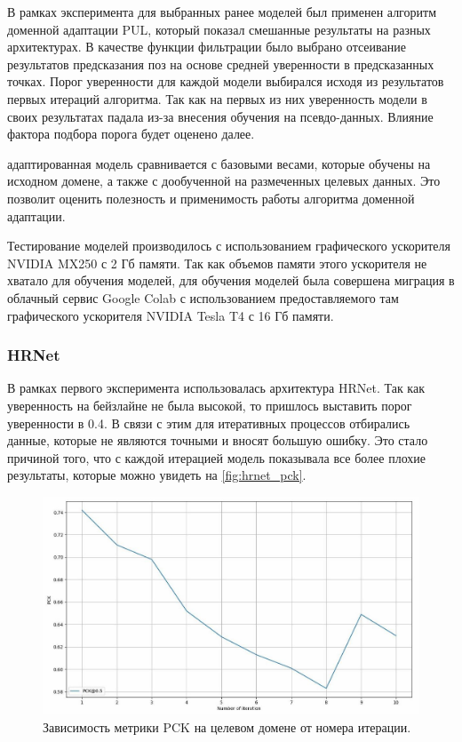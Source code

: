 В рамках эксперимента для выбранных ранее моделей был применен алгоритм доменной адаптации PUL, который показал смешанные результаты на разных архитектурах. В качестве функции фильтрации было выбрано отсеивание результатов предсказания поз на основе средней уверенности в предсказанных точках. Порог уверенности для каждой модели выбирался исходя из результатов первых итераций алгоритма. Так как на первых из них уверенность модели в своих результатах падала из-за внесения обучения на псевдо-данных. Влияние фактора подбора порога будет оценено далее.

 адаптированная модель сравнивается с базовыми весами, которые обучены на исходном домене, а также с дообученной на размеченных целевых данных. Это позволит оценить полезность и применимость работы алгоритма доменной адаптации.

Тестирование моделей производилось с использованием графического ускорителя NVIDIA MX250 с 2 Гб памяти. Так как объемов памяти этого ускорителя не хватало для обучения моделей, для обучения моделей была совершена миграция в облачный сервис Google Colab с использованием предоставляемого там графического ускорителя NVIDIA Tesla T4 с 16 Гб памяти.

\subsubsection*{HRNet}

В рамках первого эксперимента использовалась архитектура HRNet. Так как уверенность на бейзлайне не была высокой, то пришлось выставить порог уверенности в 0.4. В связи с этим для итеративных процессов отбирались данные, которые не являются точными и вносят большую ошибку. Это стало причиной того, что с каждой итерацией модель показывала все более плохие результаты, которые можно увидеть на \autoref{fig:hrnet_pck}.

\begin{figure}[h]
	\centering
	\includegraphics[width=.9\textwidth]{./images/experiment/results/hrnet/hrnet_pck}
	\caption{Зависимость метрики PCK на целевом домене от номера итерации.}
	\label{fig:hrnet_pck}
\end{figure}

